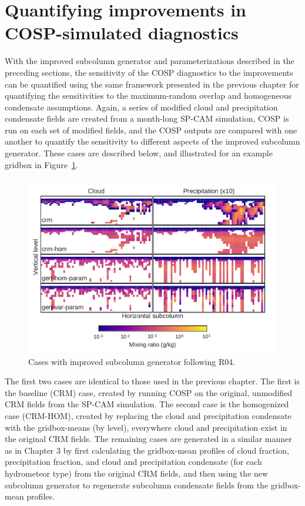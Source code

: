 \section{Quantifying improvements in COSP-simulated
diagnostics}\label{sec:subgrid2Results}

With the improved subcolumn generator and parameterizations described in
the preceding sections, the sensitivity of the COSP diagnostics to the
improvements can be quantified using the same framework presented in the
previous chapter for quantifying the sensitivities to the maximum-random
overlap and homogeneous condensate assumptions. Again, a series of
modified cloud and precipitation condensate fields are created from a
month-long SP-CAM simulation, COSP is run on each set of modified
fields, and the COSP outputs are compared with one another to quantify
the sensitivity to different aspects of the improved subcolumn
generator. These cases are described below, and illustrated for an
example gridbox in Figure~\ref{fig:mxratioExample2}.

\begin{figure}[htbp]
\centering
\includegraphics{graphics/subgrid2_mxratio_example.pdf}
\caption{\label{fig:mxratioExample2}Cases with improved subcolumn
generator following R04.}\label{fig:mxratioExample2}
\end{figure}

The first two cases are identical to those used in the previous chapter.
The first is the baseline (CRM) case, created by running COSP on the
original, unmodified CRM fields from the SP-CAM simulation. The second
case is the homogenized case (CRM-HOM), created by replacing the cloud
and precipitation condensate with the gridbox-means (by level),
everywhere cloud and precipitation exist in the original CRM fields. The
remaining cases are generated in a similar manner as in Chapter 3 by
first calculating the gridbox-mean profiles of cloud fraction,
precipitation fraction, and cloud and precipitation condensate (for each
hydrometeor type) from the original CRM fields, and then using the new
subcolumn generator to regenerate subcolumn condensate fields from the
gridbox-mean profiles.

